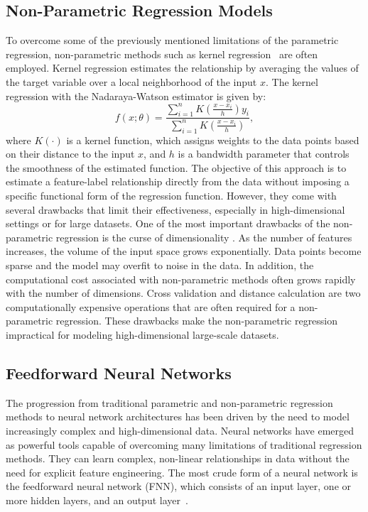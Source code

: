 \subsection{Non-Parametric Regression Models}
To overcome some of the previously mentioned limitations of the parametric regression, non-parametric methods such as kernel regression~\citep{hastie2009elements} are often employed. 
Kernel regression estimates the relationship by averaging the values of the target variable over a local neighborhood of the input $x$.
The kernel regression with the Nadaraya-Watson estimator is given by:
\begin{equation}
    f(x; \theta) = \frac{\sum_{i=1}^{n} K\left(\frac{x-x_i}{h}\right) y_i}{\sum_{i=1}^{n} K\left(\frac{x-x_i}{h}\right)},
\end{equation}
where $K(\cdot)$ is a kernel function, which assigns weights to the data points based on their distance to the input $x$, and $h$ is a bandwidth parameter that controls the smoothness of the estimated function.
The objective of this approach is to estimate a feature-label relationship directly from the data without imposing a specific functional form of the regression function.
However, they come with several drawbacks that limit their effectiveness, especially in high-dimensional settings or for large datasets. 
One of the most important drawbacks of the non-parametric regression is the curse of dimensionality \cite{bellman1966dynamic}. 
As the number of features increases, the volume of the input space grows exponentially.
Data points become sparse and the model may overfit to noise in the data.
In addition, the computational cost associated with non-parametric methods often grows rapidly with the number of dimensions.
Cross validation and distance calculation are two computationally expensive operations that are often required for a non-parametric regression.
These drawbacks make the non-parametric regression impractical for modeling high-dimensional large-scale datasets. 

\subsection{Feedforward Neural Networks}

The progression from traditional parametric and non-parametric regression methods to neural network architectures has been driven by the need to model increasingly complex and high-dimensional data.
Neural networks have emerged as powerful tools capable of overcoming many limitations of traditional regression methods. 
They can learn complex, non-linear relationships in data without the need for explicit feature engineering.
The most crude form of a neural network is the feedforward neural network (FNN), which consists of an input layer, one or more hidden layers, and an output layer~\citep{goodfellow2016}.

